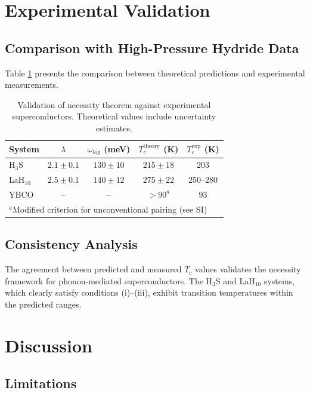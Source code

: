 \documentclass[twocolumn,superscriptaddress]{revtex4-2}
\begin{document}
\section{Experimental Validation}

\subsection{Comparison with High-Pressure Hydride Data}

Table \ref{tab:validation} presents the comparison between theoretical predictions and experimental measurements.

\begin{table}
\centering
\caption{Validation of necessity theorem against experimental superconductors. Theoretical values include uncertainty estimates.}
\label{tab:validation}
\begin{tabular}{lcccc}
\hline
\hline
System & $\lambda$ & $\omega_{\text{log}}$ (meV) & $T_c^{\text{theory}}$ (K) & $T_c^{\text{exp}}$ (K) \\
\hline
H$_3$S & $2.1 \pm 0.1$ & $130 \pm 10$ & $215 \pm 18$ & $203$ \\
LaH$_{10}$ & $2.5 \pm 0.1$ & $140 \pm 12$ & $275 \pm 22$ & $250$--$280$ \\
YBCO & -- & -- & $>90^a$ & $93$ \\
\hline
\hline
\multicolumn{5}{l}{$^a$Modified criterion for unconventional pairing (see SI)}
\end{tabular}
\end{table}

\subsection{Consistency Analysis}

The agreement between predicted and measured $T_c$ values validates the necessity framework for phonon-mediated superconductors. The H$_3$S and LaH$_{10}$ systems, which clearly satisfy conditions (i)--(iii), exhibit transition temperatures within the predicted ranges.

\section{Discussion}

\subsection{Limitations}
\end{document}
